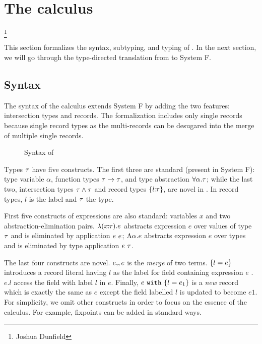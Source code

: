 \section{The \name calculus}

\footnote{Joshua Dunfield}

This section formalizes the syntax, subtyping, and typing of \name. In the next
section, we will go through the type-directed translation from \name to System
F.


\subsection{Syntax}

The syntax of the \name calculus extends System F by adding the two features:
intersection types and records. The formalization includes only single records
because single record types as the multi-records can be desugared into the merge
of multiple single records.

\begin{figure}

\caption{Syntax of \name}
\end{figure}

Types $ \tau $ have five constructs. The first three are standard (present in
System F): type variable $ \alpha $, function types $ \tau \to \tau $, and type
abstraction $ \forall \alpha. \tau $; while the last two, intersection types
$ \tau \wedge \tau $ and record types $ \{ {l} \!\!:\!\! {\tau} \} $, are novel in \Name. In
record types, $ l $ is the label and $ \tau $ the type.

First five constructs of expressions are also standard: variables $ x $ and two
abstraction-elimination pairs. $ \lambda ({x} \!\!:\!\! {\tau}). {e} $ abstracts expression
$ e $ over values of type $ \tau $ and is eliminated by application $ {e} ~ {e} $;
$ \Lambda {\alpha}. {e} $ abstracts expression $ e $ over types and is eliminated by
type application $ {e} ~ {\tau} $.

The last four constructs are novel. $ e ,\!, e $ is the \emph{merge} of two
terms. $ \{ l = e \} $ introduces a record literal having $ l $ as the
label for field containing expression $ e $ . $ e.l $ access the field with
label $ l $ in $ e $. Finally, $ e ~ \texttt{with} ~ \{ l = e_1 \} $ is a \emph{new}
record which is exactly the same as $ e $ except the field labelled $ l $ is
updated to become $ e1 $. For simplicity, we omit other constructs in order to
focus on the essence of the calculus. For example, fixpoints can be added in
standard ways.

